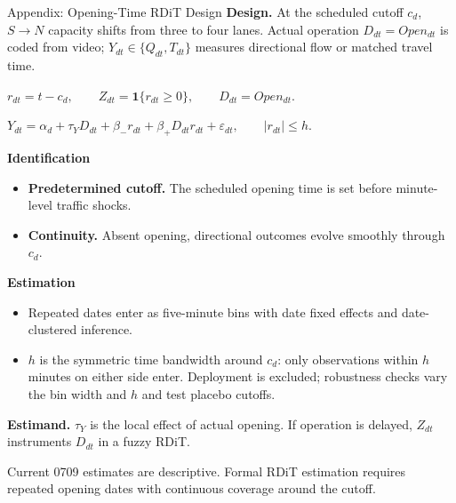 \documentclass[11pt,aspectratio=169]{beamer}
\begin{document}
\begin{frame}[label=appvideordit]{Appendix: Opening-Time RDiT Design}
\footnotesize
\textbf{Design.}
At the scheduled cutoff $c_d$, $S\to N$ capacity shifts from three to four lanes. Actual operation $D_{dt}=Open_{dt}$ is coded from video; $Y_{dt}\in\{Q_{dt},T_{dt}\}$ measures directional flow or matched travel time.

\vspace{0.35em}
{\centering
$\displaystyle r_{dt}=t-c_d,\qquad
Z_{dt}=\mathbf{1}\{r_{dt}\geq0\},\qquad
D_{dt}=Open_{dt}. $\par}

\vspace{0.40em}
{\centering
$\displaystyle
Y_{dt}=\alpha_d+\tau_YD_{dt}
+\beta_-r_{dt}+\beta_+D_{dt}r_{dt}+\varepsilon_{dt},
\qquad |r_{dt}|\leq h.$\par}

\vspace{0.45em}
\textbf{Identification}\par
\vspace{0.12em}
\begin{itemize}\footnotesize\setlength\itemsep{0.35em}
  \item \textbf{Predetermined cutoff.} The scheduled opening time is set before minute-level traffic shocks.
  \item \textbf{Continuity.} Absent opening, directional outcomes evolve smoothly through $c_d$.
\end{itemize}

\vspace{0.35em}
\textbf{Estimation}\par
\vspace{0.12em}
\begin{itemize}\footnotesize\setlength\itemsep{0.35em}
  \item Repeated dates enter as five-minute bins with date fixed effects and date-clustered inference.
  \item $h$ is the symmetric time bandwidth around $c_d$: only observations within $h$ minutes on either side enter. Deployment is excluded; robustness checks vary the bin width and $h$ and test placebo cutoffs.
\end{itemize}

\vspace{0.35em}
{\footnotesize\textbf{Estimand.} $\tau_Y$ is the local effect of actual opening. If operation is delayed, $Z_{dt}$ instruments $D_{dt}$ in a fuzzy RDiT.}

\vspace{0.45em}
{\tiny\color{gray!75!black} Current 0709 estimates are descriptive. Formal RDiT estimation requires repeated opening dates with continuous coverage around the cutoff.}

\par\vspace{0.25em}\noindent\hfill
\hyperlink{appvideofacts}{}\;
\hyperlink{nextsteps}{}
\end{frame}
\end{document}
